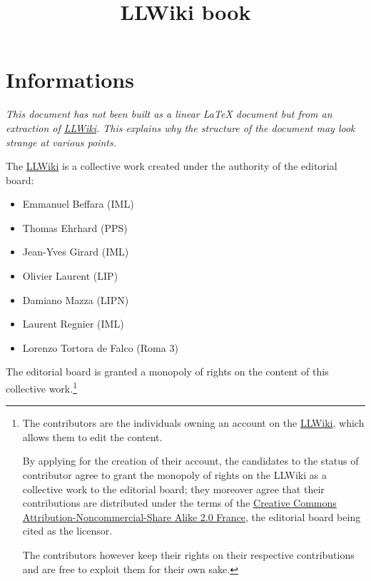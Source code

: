 \documentclass[a4paper,11pt,oneside]{book}
\title{LLWiki book}
\begin{document}
\maketitle

\chapter*{Informations}

\textit{This document has not been built as a linear \LaTeX{} document but from an extraction of \href{http://llwiki.ens-lyon.fr/}{LLWiki}.
This explains why the structure of the document may look strange at various points.}

\vspace{1.5cm}


The \href{http://llwiki.ens-lyon.fr/}{LLWiki} is a collective work created under the authority of the editorial board:
\begin{itemize}
\item Emmanuel Beffara (IML)
\item Thomas Ehrhard (PPS)
\item Jean-Yves Girard (IML)
\item Olivier Laurent (LIP)
\item Damiano Mazza (LIPN)
\item Laurent Regnier (IML)
\item Lorenzo Tortora de Falco (Roma 3)
\end{itemize}

The editorial board is granted a monopoly of rights on the content of this collective work.\footnote{The contributors are the individuals owning an account on the \href{http://llwiki.ens-lyon.fr/}{LLWiki}, which allows them to edit the content.

By applying for the creation of their account, the candidates to the status of contributor agree to grant the monopoly of rights on the LLWiki as a collective work to the editorial board; they moreover agree that their contributions are distributed under the terms of the \href{http://creativecommons.org/licenses/by-nc-sa/2.0/fr/deed.en License}{Creative Commons Attribution-Noncommercial-Share Alike 2.0 France}, the editorial board being cited as the licensor.

The contributors however keep their rights on their respective contributions and are free to exploit them for their own sake.}


\vspace{1.5cm}
\end{document}
